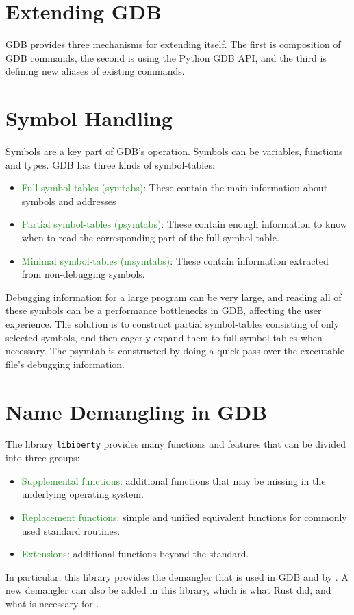\section{Extending GDB}
GDB provides three mechanisms for extending itself. The first is
composition of GDB commands, the second is using the Python GDB API, and the third is defining new aliases of existing commands.

\section{Symbol Handling}
Symbols are a key part of GDB's operation. Symbols can be variables, functions and
types. GDB has three kinds of symbol-tables:
\begin{itemize}
    \item \textcolor{ForestGreen}{Full symbol-tables (symtabs)}: These contain the main information
        about symbols and addresses
    \item \textcolor{ForestGreen} {Partial symbol-tables (psymtabs)}: These contain enough information to
        know when to read the corresponding part of the full symbol-table.
    \item \textcolor{ForestGreen}{Minimal symbol-tables (msymtabs)}: These
        contain information extracted from non-debugging symbols.
\end{itemize}

Debugging information for a large program can be very large, and reading all of
these symbols can be a performance bottlenecks in GDB, affecting the user
experience. The solution is to construct partial symbol-tables consisting of
only selected symbols, and then eagerly expand them to full symbol-tables when
necessary.
The psymtab is constructed by doing a quick pass over the executable file's
debugging information.

\section{Name Demangling in GDB}
The library \verb|libiberty| provides many functions and features that can be
divided into three groups:
\begin{itemize}
    \item \textcolor{ForestGreen}{Supplemental functions}: additional functions
        that may be missing in
        the underlying operating system.
    \item \textcolor{ForestGreen}{Replacement functions}: simple and unified equivalent functions for
        commonly used standard routines.
    \item \textcolor{ForestGreen}{Extensions}: additional functions beyond the standard.
\end{itemize}

In particular, this library provides the \CCS demangler that is used in GDB and
by \uCPP. A new
demangler can also be added in this library, which is what Rust did, and what
is necessary for \CFA.
